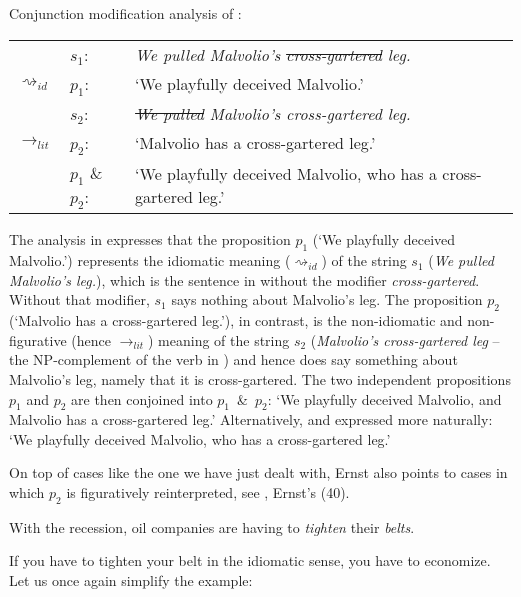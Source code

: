 \documentclass[output=paper]{langsci/langscibook}
\begin{document}
\ea \label{analysis cross-gartered leg -- simple} 
Conjunction modification analysis of : \smallskip\\
\begin{tabularx}{\linewidth}[t]{llQ}
 & 	$s_{1}$: & \textit{We pulled Malvolio's \sout{cross-gartered} leg.} \\
$\rightsquigarrow_{id}$ & $p_{1}$: & `We playfully deceived Malvolio.' \medskip\\
						& $s_{2}$: & \textit{\sout{We pulled} Malvolio's cross-gartered leg.} \\
$\rightarrow_{lit}$		& $p_{2}$: & `Malvolio has a cross-gartered leg.' \medskip\\
						& $p_{1}$ \& $p_{2}$: & `We playfully deceived Malvolio, who has a cross-gartered leg.' \\
\end{tabularx}
\z

\noindent The analysis in  expresses that the proposition $p_{1}$ (`We playfully deceived Malvolio.') represents the idiomatic meaning ($\rightsquigarrow_{id}$) of the string $s_{1}$ (\textit{We pulled Malvolio's leg.}), which is the sentence in  without the modifier \textit{cross-gartered}. Without that modifier, $s_{1}$ says nothing about Malvolio's leg. The proposition $p_{2}$ (`Malvolio has a cross-gartered leg.'), in contrast, is the non-idiomatic and non-figurative (hence $\rightarrow_{lit}$) meaning of the string $s_{2}$ (\textit{Malvolio's cross-gartered leg} -- the NP-complement of the verb in ) and hence does say something about Malvolio's leg, namely that it is cross-gartered. The two independent propositions $p_{1}$ and $p_{2}$ are then conjoined into \mbox{$p_{1}$ \& $p_{2}$}: `We playfully deceived Malvolio, and Malvolio has a cross-gartered leg.' Alternatively, and expressed more naturally: `We playfully deceived Malvolio, who has a cross-gartered leg.' 

On top of cases like the one we have just dealt with, Ernst also points to cases in which $p_{2}$ is figuratively reinterpreted, see , Ernst's (40).

\ea \label{Gucci belts}
With the recession, oil companies are having to \textit{tighten} their \underline{} \textit{belts}.
\z

\noindent If you have to tighten your belt in the idiomatic sense, you have to economize. Let us once again simplify the example:
\end{document}
